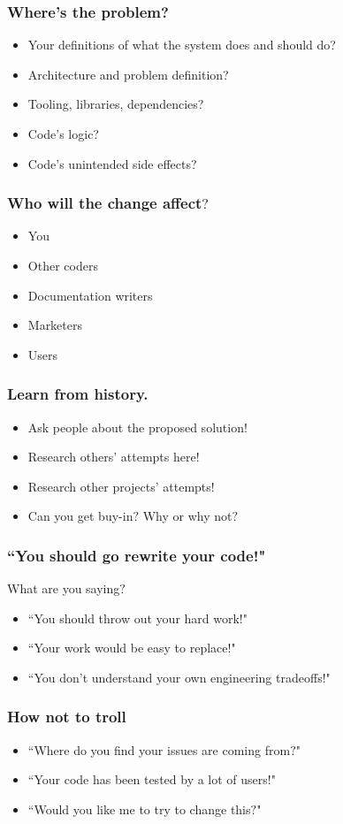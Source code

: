 \documentclass{beamer}
\begin{document}
\begin{frame}[fragile]
\frametitle{Where's the problem?}
\begin{itemize}[<+(1)->]
\item Your definitions of what the system does and should do?
\item Architecture and problem definition?
\item Tooling, libraries, dependencies?
\item Code's logic?
\item Code's unintended side effects?
\end{itemize}
\end{frame}

\begin{frame}[fragile]
\frametitle{Who will the change affect$?$}
\begin{itemize}[<+(1)->]
\item You
\item Other coders
\item Documentation writers
\item Marketers
\item Users
\end{itemize}
\end{frame}

\begin{frame}[fragile]
\frametitle{Learn from history.}
\begin{itemize}[<+(1)->]
\item Ask people about the proposed solution!
\item Research others' attempts here!
\item Research other projects' attempts!
\item Can you get buy-in$?$ Why or why not$?$
\end{itemize}
\end{frame}


\begin{frame}[fragile]
\frametitle{``You should go rewrite your code!"}
What are you saying$?$
\begin{itemize}[<+(1)->]
\item ``You should throw out your hard work!"
\item ``Your work would be easy to replace!"
\item ``You don't understand your own engineering tradeoffs!"
\end{itemize}
\end{frame}


\begin{frame}[fragile]
\frametitle{How not to troll}
\begin{itemize}[<+(1)->]
\item ``Where do you find your issues are coming from$?$"
\item ``Your code has been tested by a lot of users!"
\item ``Would you like me to try to change this$?$"
\end{itemize}
\end{frame}
\end{document}
